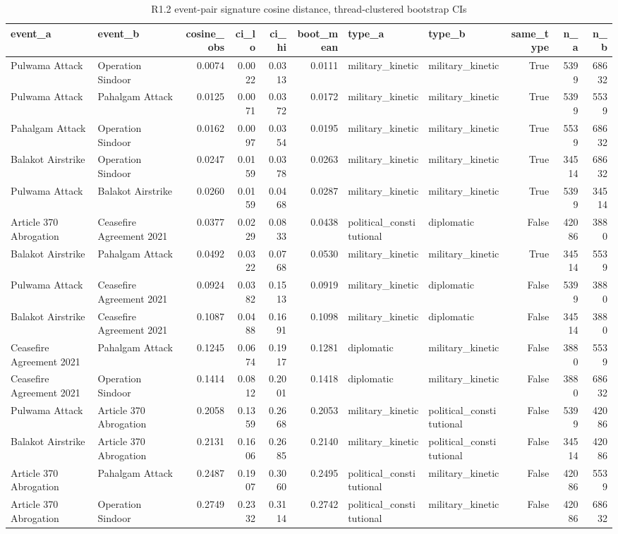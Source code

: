 \begin{table}
\caption{R1.2 event-pair signature cosine distance, thread-clustered bootstrap CIs}
\label{tab:r1r2_cosine_distances}
\begin{tabular}{llrrrrllrrr}
\toprule
event\_a & event\_b & cosine\_obs & ci\_lo & ci\_hi & boot\_mean & type\_a & type\_b & same\_type & n\_a & n\_b \\
\midrule
Pulwama Attack & Operation Sindoor & 0.0074 & 0.0022 & 0.0313 & 0.0111 & military\_kinetic & military\_kinetic & True & 5399 & 68632 \\
Pulwama Attack & Pahalgam Attack & 0.0125 & 0.0071 & 0.0372 & 0.0172 & military\_kinetic & military\_kinetic & True & 5399 & 5539 \\
Pahalgam Attack & Operation Sindoor & 0.0162 & 0.0097 & 0.0354 & 0.0195 & military\_kinetic & military\_kinetic & True & 5539 & 68632 \\
Balakot Airstrike & Operation Sindoor & 0.0247 & 0.0159 & 0.0378 & 0.0263 & military\_kinetic & military\_kinetic & True & 34514 & 68632 \\
Pulwama Attack & Balakot Airstrike & 0.0260 & 0.0159 & 0.0468 & 0.0287 & military\_kinetic & military\_kinetic & True & 5399 & 34514 \\
Article 370 Abrogation & Ceasefire Agreement 2021 & 0.0377 & 0.0229 & 0.0833 & 0.0438 & political\_constitutional & diplomatic & False & 42086 & 3880 \\
Balakot Airstrike & Pahalgam Attack & 0.0492 & 0.0322 & 0.0768 & 0.0530 & military\_kinetic & military\_kinetic & True & 34514 & 5539 \\
Pulwama Attack & Ceasefire Agreement 2021 & 0.0924 & 0.0382 & 0.1513 & 0.0919 & military\_kinetic & diplomatic & False & 5399 & 3880 \\
Balakot Airstrike & Ceasefire Agreement 2021 & 0.1087 & 0.0488 & 0.1691 & 0.1098 & military\_kinetic & diplomatic & False & 34514 & 3880 \\
Ceasefire Agreement 2021 & Pahalgam Attack & 0.1245 & 0.0674 & 0.1917 & 0.1281 & diplomatic & military\_kinetic & False & 3880 & 5539 \\
Ceasefire Agreement 2021 & Operation Sindoor & 0.1414 & 0.0812 & 0.2001 & 0.1418 & diplomatic & military\_kinetic & False & 3880 & 68632 \\
Pulwama Attack & Article 370 Abrogation & 0.2058 & 0.1359 & 0.2668 & 0.2053 & military\_kinetic & political\_constitutional & False & 5399 & 42086 \\
Balakot Airstrike & Article 370 Abrogation & 0.2131 & 0.1606 & 0.2685 & 0.2140 & military\_kinetic & political\_constitutional & False & 34514 & 42086 \\
Article 370 Abrogation & Pahalgam Attack & 0.2487 & 0.1907 & 0.3060 & 0.2495 & political\_constitutional & military\_kinetic & False & 42086 & 5539 \\
Article 370 Abrogation & Operation Sindoor & 0.2749 & 0.2332 & 0.3114 & 0.2742 & political\_constitutional & military\_kinetic & False & 42086 & 68632 \\
\bottomrule
\end{tabular}
\end{table}
